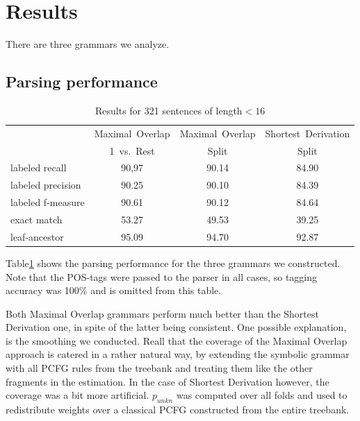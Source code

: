 \section{Results}\label{sec:Results}

There are three grammars we analyze.%




\subsection{Parsing performance}

\begin{table}[t]
\begin{tabular}{l | ccc}
&Maximal~Overlap&Maximal~Overlap&Shortest~Derivation\\
& 1~vs.~Rest& Split&Split\\\hline
labeled recall&90,97&90.14&84.90\\
labeled precision&90.25&90.10&84.39\\
labeled f-measure&90.61&90.12&84.64\\
exact match&53.27&49.53&39.25\\
leaf-ancestor&95.09&94.70&92.87\\
\end{tabular}

\caption{Results for 321 sentences of length$<16$}
\label{t:performance16}
\end{table}

Table\ref{t:performance16} shows the parsing performance for the three grammars we constructed. Note that the POS-tags were passed to the parser in all cases, so tagging accuracy was 100\% and is omitted from this table. %



Both Maximal Overlap grammars perform much better than the Shortest Derivation one, in spite of the latter being consistent. 
One possible explanation, is the smoothing we conducted. Reall that the coverage of the Maximal Overlap approach is catered in a rather natural way, by extending the symbolic grammar with all PCFG rules from the treebank and treating them like the other fragments in the estimation. In the case of Shortest Derivation however, the coverage was a bit more artificial. $p_{unkn}$ was computed over all folds and used to redistribute weights over a classical PCFG constructed from the entire treebank. 

